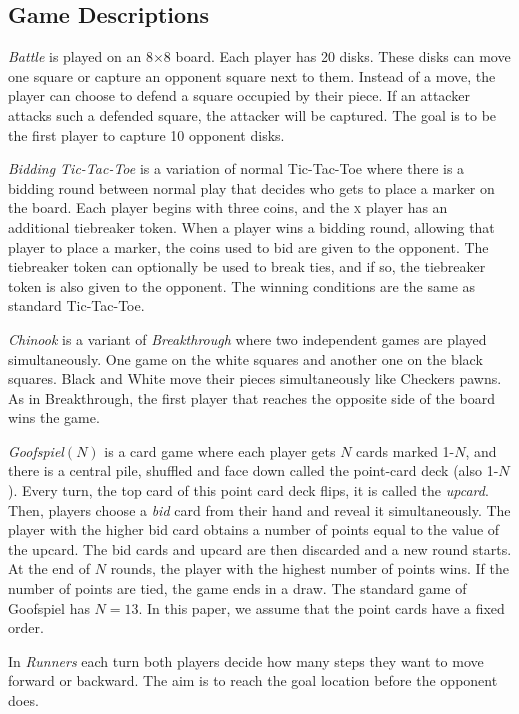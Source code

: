 \documentclass[conference]{IEEEtran}
\begin{document}
\subsection{Game Descriptions}
\label{subsec:games}

\textit{Battle} is played on an 8$\times$8 board. Each player has 20 disks. These disks can move one square or 
capture an opponent square next to them. Instead of a move, the player can choose to defend a square occupied by their 
piece. If an attacker attacks such a defended square, the attacker will be captured. The goal is to be the first player 
to capture 10 opponent disks. 

\textit{Bidding Tic-Tac-Toe} is a variation of normal Tic-Tac-Toe where there is a bidding round between 
normal play that decides who gets to place a marker on the board. Each player begins with three coins, and the 
\textsc{x} player has an additional tiebreaker token. When a player wins a bidding round, allowing that player to 
place a marker, the coins used to bid are given to the opponent. The tiebreaker token can optionally be used to break 
ties, and if so, the tiebreaker token is also given to the opponent. The winning conditions are the same as 
standard Tic-Tac-Toe. 

\textit{Chinook} is a variant of \textit{Breakthrough} where two independent games are played simultaneously. 
One game on the white squares and another one on the black squares. Black and White move their pieces simultaneously 
like Checkers pawns. As in Breakthrough, the first player that reaches the opposite side of the board wins the game. 

\textit{Goofspiel}$(N)$ is a card game where each player gets $N$ cards marked 1-$N$, and there is a central pile, 
shuffled and face down called the point-card deck (also 1-$N$). Every turn, the top card of this point card deck flips, 
it is called the {\it upcard}. Then, players choose a {\it bid} card from their hand and reveal it simultaneously. 
The player with the higher bid card obtains a number of points equal to the value of the upcard. The bid cards and 
upcard are then discarded and a new round starts. At the end of $N$ rounds, the player with the highest number of 
points wins. If the number of points are tied, the game ends in a draw. The standard game of Goofspiel has 
$N = 13$. In this paper, we assume that the point cards have a fixed order. 

In \textit{Runners} each turn both players decide how many steps they want to move forward or backward. The aim 
is to reach the goal location before the opponent does.
\end{document}
